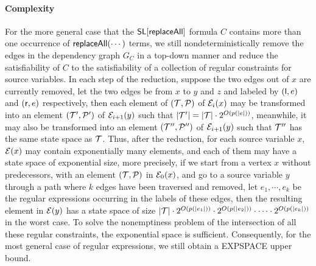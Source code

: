 \paragraph*{Complexity}
For the more general case that the $\mathsf{SL}[\mathsf{replaceAll}]$ formula $C$ contains more than one occurrence of $\mathsf{replaceAll}(\cdots)$ terms, we still nondeterministically remove the edges in the dependency graph $G_C$ in a top-down manner and reduce the satisfiability of $C$ to the satisfiability of a collection of regular constraints for source variables. 
In each step of the reduction, suppose the two edges out of $x$ are currently removed, let the two edges be from $x$ to $y$ and $z$ and labeled by $({\sf l}, e)$ and $({\sf r}, e)$ respectively, then each element of $(\mathcal{T}, \mathcal{P})$ of $\mathcal{E}_i(x)$ may be transformed into an element $(\mathcal{T}',\mathcal{P}')$ of $\mathcal{E}_{i+1}(y)$ such that $|\mathcal{T}'| = |\mathcal{T}| \cdot 2^{O(p(|e|))}$, meanwhile, it may also be transformed into an element $(\mathcal{T}'',\mathcal{P}'')$ of $\mathcal{E}_{i+1}(y)$ such that $\mathcal{T}''$ has the same state space as $\mathcal{T}$. Thus, after the reduction, for each source variable $x$, $\mathcal{E}(x)$ may contain exponentially many elements, and each of them may have a state space of exponential size, more precisely, if we start from a vertex $x$ without predecessors, with an element $(\mathcal{T},\mathcal{P})$ in $\mathcal{E}_0(x)$, and go to a source variable $y$ through a path where $k$ edges have been traversed and removed, let $e_1,\cdots, e_k$ be the regular expressions occurring in the labels of these edges, then the resulting element in $\mathcal{E}(y)$ has a state space of size $|\mathcal{T}| \cdot 2^{O(p(|e_1|))} \cdot 2^{O(p(|e_2|))} \cdot \cdots \cdot 2^{O(p(|e_k|))}$ in the worst case. To solve the nonemptiness problem of the intersection of all these regular constraints, the exponential space is sufficient. Consequently, for the most general case of regular expressions, we still obtain a EXPSPACE upper bound. 

